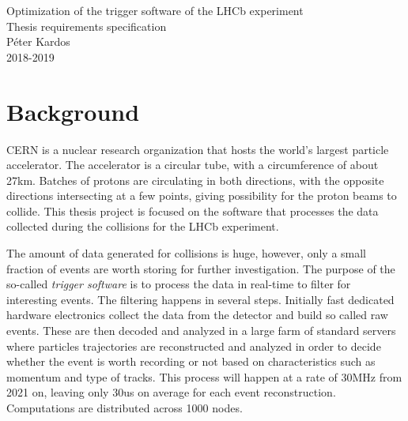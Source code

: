 \documentclass[12pt]{article}
\begin{document}
	
	
	\begin{center}
		\Huge Optimization of the trigger software of the LHCb experiment\\		
		\Large Thesis requirements specification\\
		\vspace{1pc}
		\huge Péter Kardos \\
		\large 2018-2019
	\end{center}
	\vspace{.5pc}
	
	
	\section{Background}
		
	CERN\cite{cern_about} is a nuclear research organization that hosts the world's largest particle accelerator\cite{lhc_desc}. The accelerator is a circular tube, with a circumference of about 27km. Batches of protons are circulating in both directions, with the opposite directions intersecting at a few points, giving possibility for the proton beams to collide. This thesis project is focused on the software that processes the data collected during the collisions for the LHCb\cite{lchb_desc} experiment.
	
	\vspace{0.7pc}
	The amount of data generated for collisions is huge, however, only a small fraction of events are worth storing for further investigation. The purpose of the so-called \textit{trigger software} is to process the data in real-time to filter for interesting events.
	The filtering happens in several steps. Initially fast dedicated hardware electronics collect the data from the detector and build so called raw events. These are then decoded and analyzed in a large farm of standard servers where particles trajectories are reconstructed and analyzed in order to decide whether the event is worth recording or not based on characteristics such as momentum and type of tracks. This process will happen at a rate of 30MHz from 2021 on, leaving only 30us on average for each event reconstruction. Computations are distributed across 1000 nodes.
	
\end{document}
